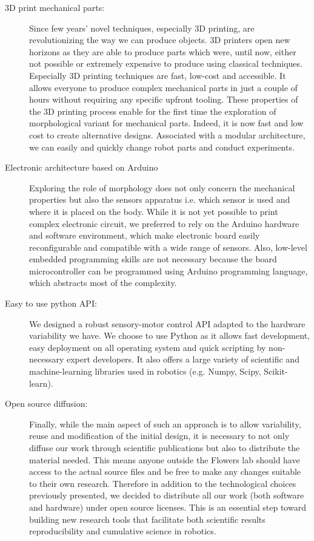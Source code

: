 \begin{description}
    \item[3D print mechanical parts:] Since few years’ novel techniques, especially 3D printing, are revolutionizing the way we can produce objects. 3D printers open new horizons as they are able to produce parts which were, until now, either not possible or extremely expensive to produce using classical techniques. Especially 3D printing techniques are fast, low-cost and accessible. It allows everyone to produce complex mechanical parts in just a couple of hours without requiring any specific upfront tooling.
    These properties of the 3D printing process enable for the first time the exploration of morphological variant for mechanical parts. Indeed, it is now fast and low cost to create alternative designs. Associated with a modular architecture, we can easily and quickly change robot parts and conduct experiments.
    \item[Electronic architecture based on Arduino] Exploring the role of morphology does not only concern the mechanical properties but also the sensors apparatus i.e. which sensor is used and where it is placed on the body. While it is not yet possible to print complex electronic circuit, we preferred to rely on the Arduino hardware and software environment, which make electronic board easily reconfigurable and compatible with a wide range of sensors. Also, low-level embedded programming skills are not necessary because the board microcontroller can be programmed using Arduino programming language, which abstracts most of the complexity.
    \item[Easy to use python API:] We designed a robust sensory-motor control API adapted to the hardware variability we have. We choose to use Python as it allows fast development, easy deployment on all operating system and quick scripting by non-necessary expert developers. It also offers a large variety of scientific and machine-learning libraries used in robotics (e.g. Numpy, Scipy, Scikit-learn).
    \item[Open source diffusion:] Finally, while the main aspect of such an approach is to allow variability, reuse and modification of the initial design, it is necessary to not only diffuse our work through scientific publications but also to distribute the material needed. This means anyone outside the Flowers lab should have access to the actual source files and be free to make any changes suitable to their own research. Therefore in addition to the technological choices previously presented, we decided to distribute all our work (both software and hardware) under open source licenses. This is an essential step toward building new research tools that facilitate both scientific results reproducibility and cumulative science in robotics.

\end{description}

